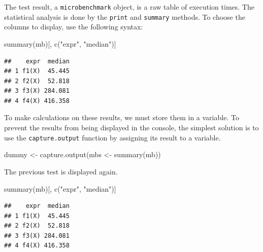 \documentclass[
  12pt,
  american,
  a4paper,
  extrafontsizes,onecolumn,openright
  ]{memoir}
\newenvironment{Shaded}{\begin{snugshade}}{\end{snugshade}}
\newcommand{\FunctionTok}[1]{\textcolor[rgb]{0.00,0.00,0.00}{#1}}
\newcommand{\NormalTok}[1]{#1}
\newcommand{\OtherTok}[1]{\textcolor[rgb]{0.56,0.35,0.01}{#1}}
\newcommand{\StringTok}[1]{\textcolor[rgb]{0.31,0.60,0.02}{#1}}
\begin{document}
The test result, a \texttt{microbenchmark} object, is a raw table of execution times.
The statistical analysis is done by the \texttt{print} and \texttt{summary} methods.
To choose the columns to display, use the following syntax:

\scriptsize

\begin{Shaded}
\begin{Highlighting}[]
\FunctionTok{summary}\NormalTok{(mb)[, }\FunctionTok{c}\NormalTok{(}\StringTok{"expr"}\NormalTok{, }\StringTok{"median"}\NormalTok{)]}
\end{Highlighting}
\end{Shaded}

\begin{verbatim}
##    expr  median
## 1 f1(X)  45.445
## 2 f2(X)  52.818
## 3 f3(X) 284.081
## 4 f4(X) 416.358
\end{verbatim}

\normalsize

To make calculations on these results, we must store them in a variable.
To prevent the results from being displayed in the console, the simplest solution is to use the \texttt{capture.output} function by assigning its result to a variable.

\scriptsize

\begin{Shaded}
\begin{Highlighting}[]
\NormalTok{dummy }\OtherTok{\textless{}{-}} \FunctionTok{capture.output}\NormalTok{(mbs }\OtherTok{\textless{}{-}} \FunctionTok{summary}\NormalTok{(mb))}
\end{Highlighting}
\end{Shaded}

\normalsize

The previous test is displayed again.

\scriptsize

\begin{Shaded}
\begin{Highlighting}[]
\FunctionTok{summary}\NormalTok{(mb)[, }\FunctionTok{c}\NormalTok{(}\StringTok{"expr"}\NormalTok{, }\StringTok{"median"}\NormalTok{)]}
\end{Highlighting}
\end{Shaded}

\begin{verbatim}
##    expr  median
## 1 f1(X)  45.445
## 2 f2(X)  52.818
## 3 f3(X) 284.081
## 4 f4(X) 416.358
\end{verbatim}
\end{document}
